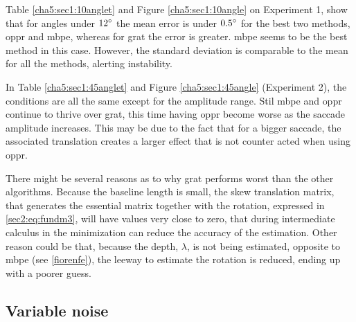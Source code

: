 Table \ref{cha5:sec1:10anglet} and Figure \ref{cha5:sec1:10angle} on Experiment 1, show that for angles under $ 12 \degree $ the mean error is under $0.5 \degree$ for the best two methods, \acrshort{oppr} and \acrshort{mbpe}, whereas for \acrshort{grat} the error is greater. \acrshort{mbpe} seems to be the best method in this case. However, the standard deviation is comparable to the mean for all the methods, alerting instability.

In Table \ref{cha5:sec1:45anglet} and Figure \ref{cha5:sec1:45angle} (Experiment 2), the conditions are all the same except for the amplitude range. Stil \acrshort{mbpe} and \acrshort{oppr} continue to thrive over \acrshort{grat}, this time having \acrshort{oppr} become worse as the saccade amplitude increases. This may be due to the fact that for a bigger saccade, the associated translation creates a larger effect that is not counter acted when using \acrshort{oppr}.

There might be several reasons as to why \acrshort{grat} performs worst than the other algorithms. Because the baseline length is small, the skew translation matrix, that generates the essential matrix together with the rotation, expressed in \ref{sec2:eq:fundm3}, will have values very close to zero, that during intermediate calculus in the minimization can reduce the accuracy of the estimation. Other reason could be that, because the depth, $\lambda$, is not being estimated, opposite to \acrshort{mbpe} (see \ref{fiorenfe}), the leeway to estimate the rotation is reduced, ending up with a poorer guess.
 

\subsection{Variable noise}
